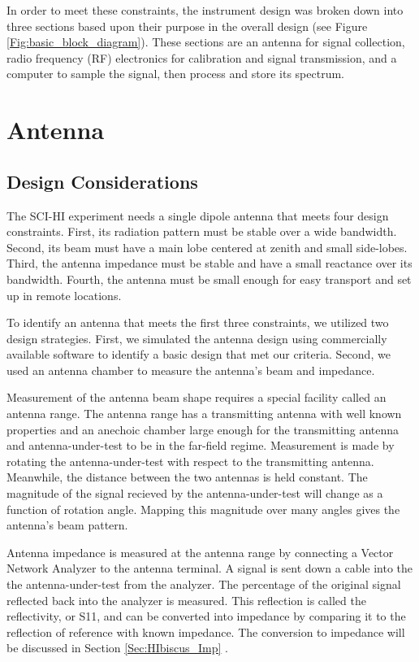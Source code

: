In order to meet these constraints, the instrument design was broken down into three sections based upon their purpose in the overall design (see Figure \ref{Fig:basic_block_diagram}). These sections are an antenna for signal collection, radio frequency (RF) electronics for calibration and signal transmission, and a computer to sample the signal, then process and store its spectrum. 



\section{Antenna}


\subsection{Design Considerations}

The SCI-HI experiment needs a single dipole antenna that meets four design constraints. First, its radiation pattern must be stable over a wide bandwidth. Second, its beam must have a main lobe centered at zenith and small side-lobes. Third, the antenna impedance must be stable and have a small reactance over its bandwidth. Fourth, the antenna must be small enough for easy transport and set up in remote locations. 

To identify an antenna that meets the first three constraints, we utilized two design strategies. First, we simulated the antenna design using commercially available software to identify a basic design that met our criteria. Second, we used an antenna chamber to measure the antenna's beam and impedance. 

Measurement of the antenna beam shape requires a special facility called an antenna range. The antenna range has a transmitting antenna with well known properties and an anechoic chamber large enough for the transmitting antenna and antenna-under-test to be in the far-field regime. Measurement is made by rotating the antenna-under-test with respect to the transmitting antenna. Meanwhile, the distance between the two antennas is held constant. The magnitude of the signal recieved by the antenna-under-test will change as a function of rotation angle. Mapping this magnitude over many angles gives the antenna's beam pattern. 

Antenna impedance is measured at the antenna range by connecting a Vector Network Analyzer to the antenna terminal. A signal is sent down a cable into the the antenna-under-test from the analyzer. The percentage of the original signal reflected back into the analyzer is measured. This reflection is called the reflectivity, or S11, and can be converted into impedance by comparing it to the reflection of reference with known impedance. The conversion to impedance will be discussed in Section \ref{Sec:HIbiscus_Imp} \cite{stutzman1981}.

